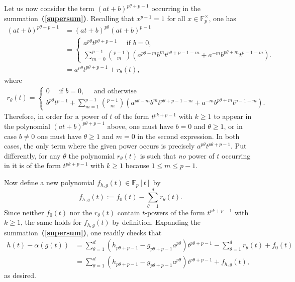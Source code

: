 \documentclass[a4paper,11pt]{amsart}
\makeatletter
\numberwithin{equation}{section}
\theoremstyle{plain}
\theoremstyle{definition}
\renewenvironment{proof}[1][\proofname] {\par\pushQED{\qed}\normalfont\topsep6\p@\@plus6\p@\relax\trivlist\item[\hskip\labelsep\bfseries#1\@addpunct{.}]\ignorespaces}{\popQED\endtrivlist\@endpefalse}
\newcommand{\F}{\mathbb{F}}
\newcommand{\bref}[1]{{\bf(\ref{#1})}} %
\makeatother
\begin{document}
\begin{proof}
Let us now consider the term $(at+b)^{p\theta+p-1}$ occurring in the summation~\bref{supersum}. Recalling that $x^{p-1} = 1$ for all $x \in \F_p^\times$, one has 
\begin{align*}
(at+b)^{p\theta+p-1} & = (at+b)^{p\theta}(at+b)^{p-1} \\
& = \begin{cases} a^{p\theta}t^{p\theta+p-1} \quad \text{ if } b=0, \\ 
\sum_{m=0}^{p-1}\binom{p-1}{m}\left( a^{p\theta-m} b^m t^{p\theta+p-1-m} + a^{-m}b^{p\theta+m}t^{p-1-m} \right). \end{cases} \\
& = a^{p\theta}t^{p\theta+p-1} + r_{\theta}(t),
\end{align*}
where 
\begin{align*}
r_{\theta}(t) = \begin{cases} 0 \quad \text{ if } b=0, \quad \text{ and otherwise} \\ 
b^{p\theta}t^{p-1}+\sum_{m=1}^{p-1}\binom{p-1}{m}\left( a^{p\theta-m} b^m t^{p\theta+p-1-m} + a^{-m}b^{p\theta+m}t^{p-1-m} \right). \end{cases}
\end{align*}
Therefore, in order for a power of $t$ of the form $t^{pk+p-1}$ with $k\geq 1$ to appear in the polynomial $(at+b)^{p\theta+p-1}$ above, one must have $b=0$ {and} $\theta \geq 1$, or in case $b\neq 0$ one must have $\theta \geq 1$ and $m=0$ in the second expression. In both cases, the only term where the given power occurs is precisely $a^{p\theta}t^{p\theta+p-1}$. Put differently, for any $\theta$ the polynomial $r_\theta(t)$ is such that \emph{no} power of $t$ occurring in it is of the form $t^{pk+p-1}$ with $k\geq 1$ because $1 \leq m \leq p-1$.

Now define a new polynomial $f_{h,g}(t) \in \F_p[t]$ by  
\[f_{h,g}(t) := f_0(t) - \sum_{\theta=1}^d r_{\theta}(t).\]
Since neither $f_0(t)$ nor the $r_{\theta}(t)$ contain $t$-powers of the form $t^{pk+p-1}$ with $k \geq 1$, the same holds for $f_{h,g}(t)$ by definition. Expanding the summation~\bref{supersum}, one readily checks that 
\begin{align*}
 h(t) - \alpha(g(t)) & = \sum_{\theta=1}^d (h_{p\theta+p-1}-g_{p\theta+p-1}a^{p\theta})t^{p\theta+p-1} - \sum_{\theta=1}^d r_{\theta}(t) + f_0(t) \\
 & = \sum_{\theta=1}^d (h_{p\theta+p-1}-g_{p\theta+p-1}a^{p\theta})t^{p\theta+p-1} + f_{h,g}(t),
\end{align*}
as desired.  
\end{proof}
\end{document}

